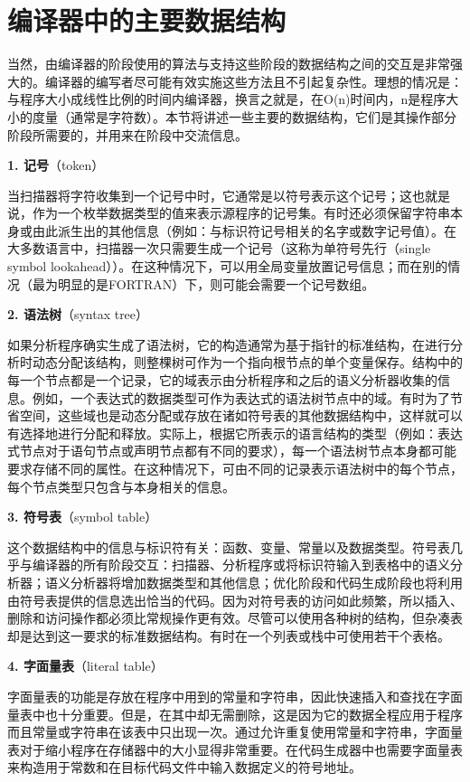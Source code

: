 \documentclass[lang=cn,10pt]{elegantbook}
\begin{document}
\section{编译器中的主要数据结构}
\label{sec:1-4}

当然，由编译器的阶段使用的算法与支持这些阶段的数据结构之间的交互是非常强大的。编译器的编写者尽可能有效实施这些方法且不引起复杂性。理想的情况是：与程序大小成线性比例的时间内编译器，换言之就是，在O(n)时间内，n是程序大小的度量（通常是字符数）。本节将讲述一些主要的数据结构，它们是其操作部分阶段所需要的，并用来在阶段中交流信息。

\textbf{1. 记号}（token）

当扫描器将字符收集到一个记号中时，它通常是以符号表示这个记号；这也就是说，作为一个枚举数据类型的值来表示源程序的记号集。有时还必须保留字符串本身或由此派生出的其他信息（例如：与标识符记号相关的名字或数字记号值）。在大多数语言中，扫描器一次只需要生成一个记号（这称为单符号先行（single symbol lookahead））。在这种情况下，可以用全局变量放置记号信息；而在别的情况（最为明显的是FORTRAN）下，则可能会需要一个记号数组。

\textbf{2. 语法树}（syntax tree）

如果分析程序确实生成了语法树，它的构造通常为基于指针的标准结构，在进行分析时动态分配该结构，则整棵树可作为一个指向根节点的单个变量保存。结构中的每一个节点都是一个记录，它的域表示由分析程序和之后的语义分析器收集的信息。例如，一个表达式的数据类型可作为表达式的语法树节点中的域。有时为了节省空间，这些域也是动态分配或存放在诸如符号表的其他数据结构中，这样就可以有选择地进行分配和释放。实际上，根据它所表示的语言结构的类型（例如：表达式节点对于语句节点或声明节点都有不同的要求），每一个语法树节点本身都可能要求存储不同的属性。在这种情况下，可由不同的记录表示语法树中的每个节点，每个节点类型只包含与本身相关的信息。

\textbf{3. 符号表}（symbol table）

这个数据结构中的信息与标识符有关：函数、变量、常量以及数据类型。符号表几乎与编译器的所有阶段交互：扫描器、分析程序或将标识符输入到表格中的语义分析器；语义分析器将增加数据类型和其他信息；优化阶段和代码生成阶段也将利用由符号表提供的信息选出恰当的代码。因为对符号表的访问如此频繁，所以插入、删除和访问操作都必须比常规操作更有效。尽管可以使用各种树的结构，但杂凑表却是达到这一要求的标准数据结构。有时在一个列表或栈中可使用若干个表格。

\textbf{4. 字面量表}（literal table）

字面量表的功能是存放在程序中用到的常量和字符串，因此快速插入和查找在字面量表中也十分重要。但是，在其中却无需删除，这是因为它的数据全程应用于程序而且常量或字符串在该表中只出现一次。通过允许重复使用常量和字符串，字面量表对于缩小程序在存储器中的大小显得非常重要。在代码生成器中也需要字面量表来构造用于常数和在目标代码文件中输入数据定义的符号地址。
\end{document}
